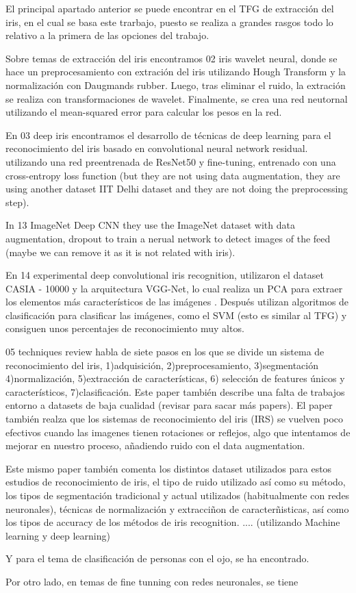 
El principal apartado anterior se puede  encontrar en el TFG de extracción del iris, en el cual se basa este trarbajo, puesto se realiza a grandes rasgos
todo lo relativo a la primera de las opciones del trabajo.

Sobre temas de extracción del iris encontramos 02 iris wavelet neural, donde se hace un preprocesamiento con extración del iris utilizando Hough Transform y la 
normalización con Daugmands rubber. Luego, tras eliminar el ruido, la extración se realiza con transformaciones de wavelet. Finalmente, se crea una red neutornal
utilizando el mean-squared error para calcular los pesos en la red.

En 03 deep iris encontramos el desarrollo de técnicas de deep learning para el reconocimiento del iris basado en convolutional neural network residual. utilizando una red preentrenada 
de ResNet50 y fine-tuning, entrenado con una cross-entropy loss function (but they are not using data augmentation, they are using another dataset IIT Delhi dataset and they are 
not doing the preprocessing step).

In 13 ImageNet Deep CNN they use the ImageNet dataset with data augmentation, dropout to train a nerual network to detect images of the feed (maybe we can remove it as
it is not related with iris).

En 14 experimental deep convolutional iris recognition, utilizaron el dataset CASIA - 10000 y la arquitectura VGG-Net, lo cual realiza un PCA para extraer los elementos
más característicos de las imágenes . Después utilizan algoritmos de clasificación para clasificar las imágenes, como el SVM (esto es similar al TFG) y consiguen unos percentajes
de reconocimiento muy altos.

05 techniques review habla de siete pasos en los que se divide un sistema de reconocimiento del iris, 1)adquisición, 2)preprocesamiento, 3)segmentación
 4)normalización, 5)extracción de características, 6) selección de features únicos y característicos, 7)clasificación. Este paper también describe una falta de
 trabajos entorno a datasets de baja cualidad (revisar para sacar más papers). El paper también realza que los sistemas de reconocimiento del iris (IRS) se vuelven 
 poco efectivos cuando las imagenes tienen rotaciones or reflejos, algo que intentamos de mejorar en nuestro proceso, añadiendo ruido con el data augmentation.

 Este mismo paper también comenta los distintos dataset utilizados para estos estudios de reconocimiento de iris, el tipo de ruido utilizado así como su método,
 los tipos de segmentación tradicional y actual utilizados (habitualmente con redes neuronales), técnicas de normalización y extracciñon de caracterñisticas, así 
 como los tipos de accuracy de los métodos de iris recognition.
.... (utilizando Machine learning y deep learning)

Y para el tema de clasificación de personas con el ojo, se ha encontrado.

Por otro lado, en temas de fine tunning con redes neuronales, se tiene